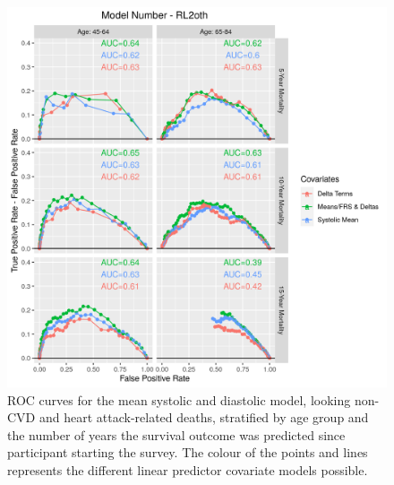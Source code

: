 \documentclass[
]{article}
\begin{document}
\begin{figure}
\centering
\includegraphics{./Rmarkdown_Plots/ROC_CAx-Covariates_EventType_RL2oth.png}
\caption{ROC curves for the mean systolic and diastolic model, looking non-CVD and heart attack-related deaths, stratified by age group and the number of years the survival outcome was predicted since participant starting the survey. The colour of the points and lines represents the different linear predictor covariate models possible.}\label{fig:ROC_RL2oth}
\end{figure}
\end{document}
